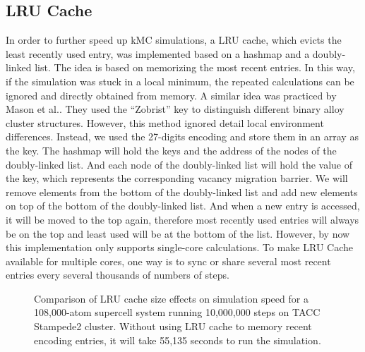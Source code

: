 \subsection{\acf{LRU} Cache}
\label{Chap:Al/Vac:sec:LRU}
In order to further speed up \ac{kMC} simulations, a \acf{LRU} cache, which evicts the least recently used entry, was implemented based on a hashmap and a  doubly-linked list. The idea is based on memorizing the most recent entries. In this way, if the simulation was stuck in a local minimum, the repeated calculations can be ignored and directly obtained from memory. A similar idea was practiced by Mason et al.\cite{mason2005fast}. They used the ``Zobrist'' key to distinguish different binary alloy cluster structures. However, this method ignored detail local environment differences. Instead, we used the 27-digits encoding and store them in an array as the key. The hashmap will hold the keys and the address of the nodes of the doubly-linked list. And each node of the doubly-linked list will hold the value of the key, which represents the corresponding vacancy migration barrier. We will remove elements from the bottom of the doubly-linked list and add new elements on top of the bottom of the doubly-linked list. And when a new entry is accessed, it will be moved to the top again, therefore most recently used entries will always be on the top and least used will be at the bottom of the list. However, by now this implementation only supports single-core calculations. To make \ac{LRU} Cache available for multiple cores, one way is to sync or share several most recent entries every several thousands of numbers of steps.


\begingroup
\begin{figure}[!ht]
  \centering
\caption[Comparison of \acs{LRU} cache size effects on simulation speed for a 108,000-atom supercell system running 10,000,000 steps on TACC Stampede2 cluster.]{Comparison of \acs{LRU} cache size effects on simulation speed for a 108,000-atom supercell system running 10,000,000 steps on TACC Stampede2 cluster. Without using \ac{LRU} cache to memory recent encoding entries, it will take 55,135 seconds to run the simulation.}
\label{Chap:Al/Vac:fig:lru_size}
\end{figure}
\endgroup



